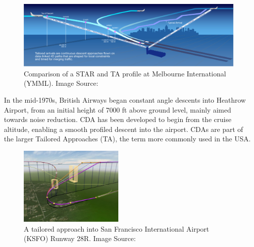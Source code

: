 \documentclass{aer1315-pretty}
\begin{document}
\vspace{-0.8mm}
\begin{figure}[!h]
\centering
\includegraphics[width=1\textwidth]{figures/Tailored_Arrivals_YMML.jpg}
	\caption{Comparison of a STAR and TA profile at Melbourne International (YMML). Image Source: \cite{Boeing:a}}	
	\label{fig:CompareYMML}
\end{figure}
\vspace{-0.8mm}
In the mid-1970s, British Airways began constant angle descents into Heathrow Airport, from an initial height of 7000 ft above ground level, mainly aimed towards noise reduction. CDA has been developed to begin from the cruise altitude, enabling a smooth profiled descent into the airport. CDAs are part of the larger Tailored Approaches (TA), the term more commonly used in the USA.\par

\begin{figure}
\centering
\includegraphics[width=0.45\textwidth]{figures/KSFO_CDA.png}
	\caption{A tailored approach into San Francisco International Airport (KSFO) Runway 28R. Image Source: \cite{Boeing}}	
	\label{fig:KSFO ILS 28R}
\end{figure}
\end{document}
